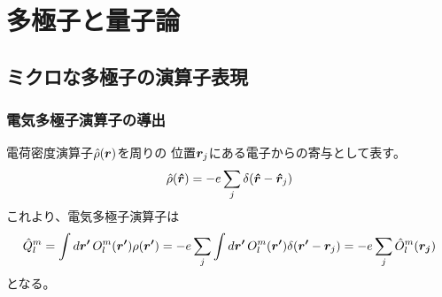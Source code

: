\documentclass[../master.tex]{subfiles}
\begin{document}
\chapter{多極子と量子論}
\section{ミクロな多極子の演算子表現}
\subsection*{電気多極子演算子の導出}
電荷密度演算子\(\hat{\rho}(\vb*{r})\)を周りの
位置\(\vb*{r}_j\)にある電子からの寄与として表す。
\begin{equation}
    \hat{\rho}(\vb*{\hat{r}}) = -e\sum_{j} \delta(\vb*{\hat{r}}-\vb*{\hat{r}}_j)
\end{equation}
これより、電気多極子演算子は
\begin{align}
    \hat{Q}_l^m
    = \int d\vb*{r'}\, O_l^m(\vb*{r'}) \rho(\vb*{r'})
    =-e \sum_{j} \int d\vb*{r'}\, O_l^m(\vb*{r'}) \delta(\vb*{r'}-\vb*{r}_j)
    = -e \sum_{j} \hat{O}_l^m(\vb*{r_j})
\end{align}
となる。
\end{document}
